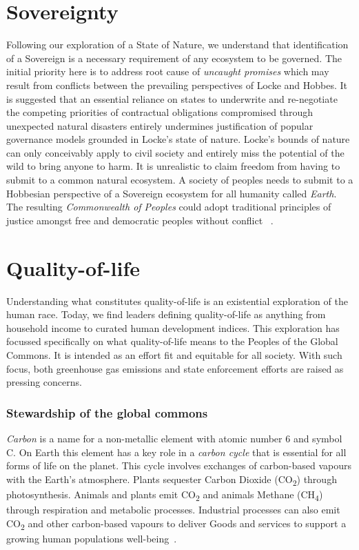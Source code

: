\documentclass[11pt, oneside]{book}   	%
\begin{document}
\section{Sovereignty}
Following our exploration of a State of Nature, we understand that identification of a Sovereign is a necessary requirement of any ecosystem to be governed.
The initial priority here is to address root cause of \emph{uncaught promises} which may result from conflicts between the prevailing perspectives of Locke and Hobbes.
It is suggested that an essential reliance on states to underwrite and re-negotiate the competing priorities of contractual obligations compromised through unexpected natural disasters entirely undermines justification of popular governance models grounded in Locke's state of nature.
Locke's bounds of nature can only conceivably apply to civil society and entirely miss the potential of the wild to bring anyone to harm.
It is unrealistic to claim freedom from having to submit to a common natural ecosystem.
A society of peoples needs to submit to a Hobbesian perspective of a Sovereign ecosystem for all humanity called \emph{Earth}.
The resulting \emph{Commonwealth of Peoples} could adopt traditional principles of justice amongst free and democratic peoples without conflict ~\cite{jr2}.\

\section{Quality-of-life}
Understanding what constitutes quality-of-life is an existential exploration of the human race.
Today, we find leaders defining quality-of-life as anything from household income to curated human development indices.
This exploration has focussed specifically on what quality-of-life means to the Peoples of the Global Commons.
It is intended as an effort fit and equitable for all society.
With such focus, both greenhouse gas emissions and state enforcement efforts are raised as pressing concerns.

\subsubsection{Stewardship of the global commons}
\emph{Carbon} is a name for a non-metallic element with atomic number 6 and symbol C.
On Earth this element has a key role in a \emph{carbon cycle} that is essential for all forms of life on the planet.
This cycle involves exchanges of carbon-based vapours with the Earth's atmosphere.
Plants sequester Carbon Dioxide (CO\textsubscript{2}) through photosynthesis.
Animals and plants emit CO\textsubscript{2} and animals Methane (CH\textsubscript{4}) through respiration and metabolic processes.
Industrial processes can also emit CO\textsubscript{2} and other carbon-based vapours to deliver Goods and services to support a growing human populations well-being~\cite{ng1}.\
\end{document}
